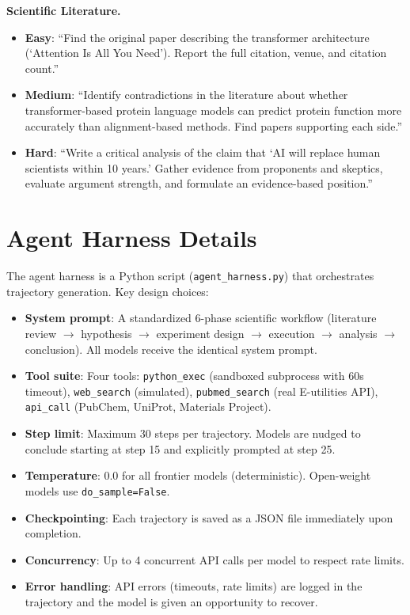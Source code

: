 \documentclass{article}
\begin{document}
\textbf{Scientific Literature.}
\begin{itemize}
\item \textbf{Easy}: ``Find the original paper describing the transformer architecture (`Attention Is All You Need'). Report the full citation, venue, and citation count.''
\item \textbf{Medium}: ``Identify contradictions in the literature about whether transformer-based protein language models can predict protein function more accurately than alignment-based methods. Find papers supporting each side.''
\item \textbf{Hard}: ``Write a critical analysis of the claim that `AI will replace human scientists within 10 years.' Gather evidence from proponents and skeptics, evaluate argument strength, and formulate an evidence-based position.''
\end{itemize}

\section{Agent Harness Details}
\label{app:harness}

The agent harness is a Python script (\texttt{agent\_harness.py}) that orchestrates trajectory generation. Key design choices:

\begin{itemize}
\item \textbf{System prompt}: A standardized 6-phase scientific workflow (literature review $\to$ hypothesis $\to$ experiment design $\to$ execution $\to$ analysis $\to$ conclusion). All models receive the identical system prompt.
\item \textbf{Tool suite}: Four tools: \texttt{python\_exec} (sandboxed subprocess with 60s timeout), \texttt{web\_search} (simulated), \texttt{pubmed\_search} (real E-utilities API), \texttt{api\_call} (PubChem, UniProt, Materials Project).
\item \textbf{Step limit}: Maximum 30 steps per trajectory. Models are nudged to conclude starting at step 15 and explicitly prompted at step 25.
\item \textbf{Temperature}: 0.0 for all frontier models (deterministic). Open-weight models use \texttt{do\_sample=False}.
\item \textbf{Checkpointing}: Each trajectory is saved as a JSON file immediately upon completion.
\item \textbf{Concurrency}: Up to 4 concurrent API calls per model to respect rate limits.
\item \textbf{Error handling}: API errors (timeouts, rate limits) are logged in the trajectory and the model is given an opportunity to recover.
\end{itemize}
\end{document}
